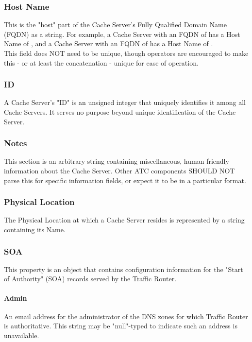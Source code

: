 \subsubsection{Host Name}
This is the "host" part of the Cache Server's Fully Qualified Domain Name (FQDN)
as a string. For example, a Cache Server with an FQDN of  has a
Host Name of , and a Cache Server with an FQDN of
 has a Host Name of .\\
This field does NOT need to be unique, though operators are encouraged to make
this - or at least the concatenation  - unique
for ease of operation.

\subsubsection{ID}
A Cache Server's "ID" is an unsigned integer that uniquely identifies it among
all Cache Servers. It serves no purpose beyond unique identification of the
Cache Server.

\subsubsection{Notes}
This section is an arbitrary string containing miscellaneous, human-friendly
information about the Cache Server. Other ATC components SHOULD NOT parse this
for specific information fields, or expect it to be in a particular format.

\subsubsection{Physical Location}
The Physical Location at which a Cache Server resides is represented by a string
containing its Name.

\subsubsection{SOA}
This property is an object that contains configuration information for the
"Start of Authority" (SOA) records served by the Traffic Router.

\paragraph{Admin}
An email address for the administrator of the DNS zones for which Traffic Router
is authoritative. This string may be "null"-typed to indicate such an address is
unavailable.

